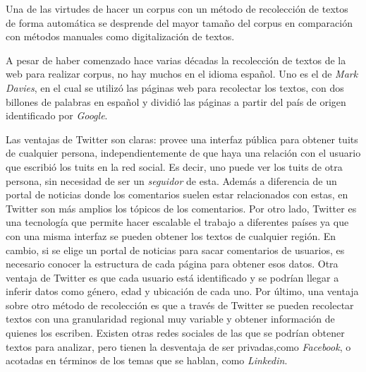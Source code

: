 Una de las virtudes de hacer un corpus con un método de recolección de textos de forma automática se desprende del mayor tamaño del corpus en comparación con métodos manuales como digitalización de textos.

A pesar de haber comenzado hace varias décadas la recolección de textos de la web para realizar corpus, no hay muchos en el idioma español.
Uno es el de \textit{Mark Davies}, en el cual se utilizó las páginas web para recolectar los textos, con dos billones de palabras en español y dividió las páginas a partir del país de origen identificado por \textit{Google}.

Las ventajas de Twitter son claras: provee una interfaz pública para obtener tuits de cualquier persona, independientemente de que haya una relación con el usuario que escribió los tuits en la red social. Es decir, uno puede ver los tuits de otra persona, sin necesidad de ser un \textit{seguidor} de esta. Además a diferencia de un portal de noticias donde los comentarios suelen estar relacionados con estas, en Twitter son más amplios los tópicos de los comentarios.
Por otro lado, Twitter es una tecnología que permite hacer escalable el trabajo a diferentes países ya que con una misma interfaz se pueden obtener los textos de cualquier región. En cambio, si se elige un portal de noticias para sacar comentarios de usuarios, es necesario conocer la estructura de cada página para obtener esos datos.
Otra ventaja de Twitter es que cada usuario está identificado y se podrían llegar a inferir datos como género, edad y ubicación de cada uno.
Por último, una ventaja sobre otro método de recolección es que a través de Twitter se pueden recolectar textos con una granularidad regional muy variable y obtener información de quienes los escriben.
Existen otras redes sociales de las que se podrían obtener textos para analizar, pero tienen la desventaja de ser privadas,como \textit{Facebook}, o acotadas en términos de los temas que se hablan, como \textit{Linkedin}. 




